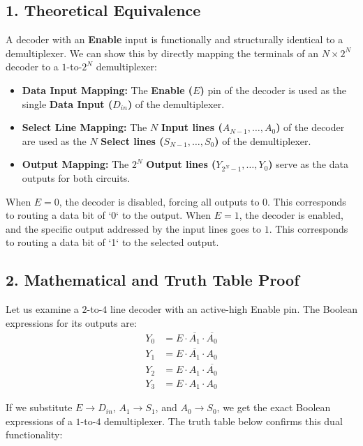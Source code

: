 \documentclass[12pt,a3paper]{article}
\begin{document}
\begin{enumerate}
\begin{tcolorbox}[enhanced,breakable,ansbox,colback=cD!4,colframe=cD,boxrule=0.8pt,arc=5pt,title={\textbf{Answer}},fonttitle=\bfseries\color{white},colbacktitle=cD]
\subsection*{1. Theoretical Equivalence}
A decoder with an \textbf{Enable} input is functionally and structurally identical to a demultiplexer. We can show this by directly mapping the terminals of an $N \times 2^N$ decoder to a $1$-to-$2^N$ demultiplexer:

\begin{itemize}
    \item \textbf{Data Input Mapping:} The \textbf{Enable ($E$)} pin of the decoder is used as the single \textbf{Data Input ($D_{in}$)} of the demultiplexer.
    \item \textbf{Select Line Mapping:} The $N$ \textbf{Input lines ($A_{N-1}, \dots, A_0$)} of the decoder are used as the $N$ \textbf{Select lines ($S_{N-1}, \dots, S_0$)} of the demultiplexer.
    \item \textbf{Output Mapping:} The $2^N$ \textbf{Output lines ($Y_{2^N-1}, \dots, Y_0$)} serve as the data outputs for both circuits.
\end{itemize}

When $E = 0$, the decoder is disabled, forcing all outputs to $0$. This corresponds to routing a data bit of `0` to the output. When $E = 1$, the decoder is enabled, and the specific output addressed by the input lines goes to $1$. This corresponds to routing a data bit of `1` to the selected output.

\vspace{0.2cm}
\subsection*{2. Mathematical and Truth Table Proof}
Let us examine a $2$-to-$4$ line decoder with an active-high Enable pin. The Boolean expressions for its outputs are:
\begin{align*}
    Y_0 &= E \cdot \overline{A_1} \cdot \overline{A_0} \\
    Y_1 &= E \cdot \overline{A_1} \cdot A_0 \\
    Y_2 &= E \cdot A_1 \cdot \overline{A_0} \\
    Y_3 &= E \cdot A_1 \cdot A_0
\end{align*}

If we substitute $E \rightarrow D_{in}$, $A_1 \rightarrow S_1$, and $A_0 \rightarrow S_0$, we get the exact Boolean expressions of a $1$-to-$4$ demultiplexer. The truth table below confirms this dual functionality:


\end{tcolorbox}
\end{enumerate}
\end{document}
